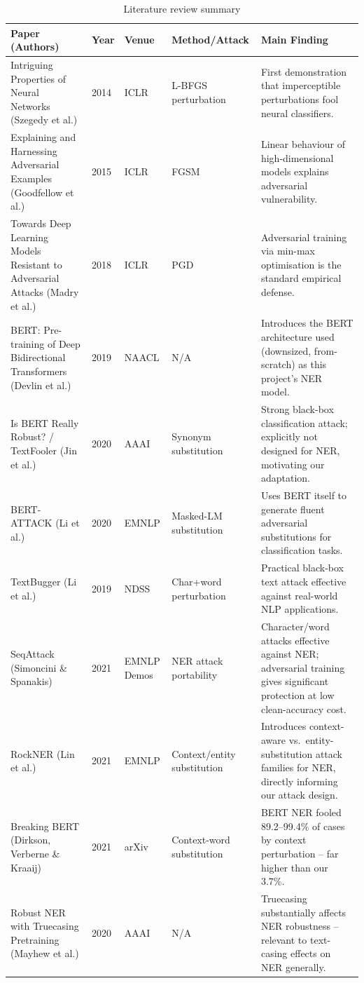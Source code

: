 \documentclass[conference]{IEEEtran}
\begin{document}
\begin{table}[!ht]
\centering
\caption{Literature review summary}
\label{tab:litreview}
\small
\begin{tabular}{p{3.3cm}p{0.5cm}p{1.6cm}p{2.7cm}p{7.5cm}}
\toprule
Paper (Authors) & Year & Venue & Method/Attack & Main Finding \\
\midrule
Intriguing Properties of Neural Networks (Szegedy et al.) & 2014 & ICLR & L-BFGS perturbation & First demonstration that imperceptible perturbations fool neural classifiers. \\
Explaining and Harnessing Adversarial Examples (Goodfellow et al.) & 2015 & ICLR & FGSM & Linear behaviour of high-dimensional models explains adversarial vulnerability. \\
Towards Deep Learning Models Resistant to Adversarial Attacks (Madry et al.) & 2018 & ICLR & PGD & Adversarial training via min-max optimisation is the standard empirical defense. \\
BERT: Pre-training of Deep Bidirectional Transformers (Devlin et al.) & 2019 & NAACL & N/A & Introduces the BERT architecture used (downsized, from-scratch) as this project's NER model. \\
Is BERT Really Robust? / TextFooler (Jin et al.) & 2020 & AAAI & Synonym substitution & Strong black-box classification attack; explicitly not designed for NER, motivating our adaptation. \\
BERT-ATTACK (Li et al.) & 2020 & EMNLP & Masked-LM substitution & Uses BERT itself to generate fluent adversarial substitutions for classification tasks. \\
TextBugger (Li et al.) & 2019 & NDSS & Char+word perturbation & Practical black-box text attack effective against real-world NLP applications. \\
SeqAttack (Simoncini \& Spanakis) & 2021 & EMNLP Demos & NER attack portability & Character/word attacks effective against NER; adversarial training gives significant protection at low clean-accuracy cost. \\
RockNER (Lin et al.) & 2021 & EMNLP & Context/entity substitution & Introduces context-aware vs.\ entity-substitution attack families for NER, directly informing our attack design. \\
Breaking BERT (Dirkson, Verberne \& Kraaij) & 2021 & arXiv & Context-word substitution & BERT NER fooled 89.2--99.4\% of cases by context perturbation -- far higher than our 3.7\%. \\
Robust NER with Truecasing Pretraining (Mayhew et al.) & 2020 & AAAI & N/A & Truecasing substantially affects NER robustness -- relevant to text-casing effects on NER generally. \\

\end{tabular}
\end{table}
\end{document}
